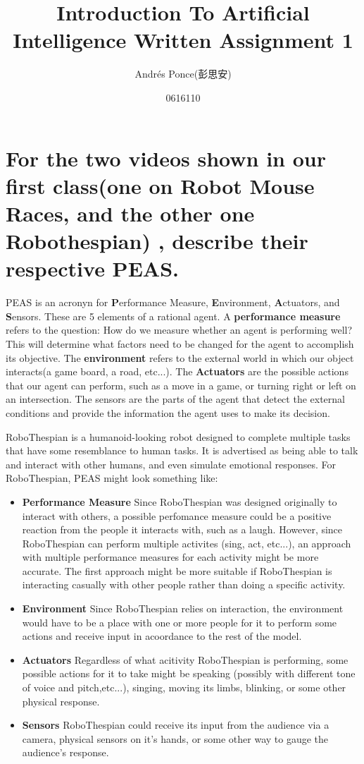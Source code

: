 \documentclass{article}
\title{Introduction To Artificial Intelligence Written Assignment 1}
\author{Andr\'es Ponce(彭思安) \\
\and
0616110}
\begin{document}
\maketitle
\section{For the two videos shown in our first class(one on Robot Mouse Races, and the other one Robothespian)
, describe their respective PEAS.}
PEAS is an acronyn for \textbf{P}erformance Measure, \textbf{E}nvironment, \textbf{A}ctuators, and
\textbf{S}ensors. These are 5 elements of a rational agent. A \textbf{performance measure} 
refers to the question:
How do we measure whether an agent is performing well? This will determine what factors need to be changed
for the agent to accomplish its objective. The \textbf{environment} refers to the external world in which
our object interacts(a game board, a road, etc...). The \textbf{Actuators} are the possible actions that 
our agent can perform, such as a move in a game, or turning right or left on an intersection. The sensors
are the parts of the agent that detect the external conditions and provide the information the agent uses
to make its decision.

RoboThespian is a humanoid-looking robot designed to complete multiple tasks that have some resemblance to 
human tasks. It is advertised as being able to talk and interact with other humans, and even simulate 
emotional responses. For RoboThespian, PEAS might look something like:
\begin{itemize}
	\item \textbf{Performance Measure} Since RoboThespian was designed originally to interact with others,	
			a possible perfomance measure could be a positive reaction from the people it interacts with,
			such as a laugh. 
			However, since RoboThespian can perform multiple activites (sing, act, etc...), an approach with 
			multiple performance measures for each activity might be more accurate. The first approach might	
			be more suitable if RoboThespian is interacting casually with other people rather than doing a
			specific activity.
	\item \textbf{Environment} Since RoboThespian relies on interaction, the environment would have to be 
			a place with one or more people for it to perform some actions and receive input in acoordance 
			to the rest of the model.
	\item \textbf{Actuators} Regardless of what acitivity RoboThespian is performing, some possible 
			actions for it to take might be speaking (possibly with different tone of voice and pitch,etc...),
			singing, moving its limbs, blinking, or some other physical response.
	\item \textbf{Sensors} RoboThespian could receive its input from the audience via a camera, physical 
			sensors on it's hands, or some other way to gauge the audience's response.
\end{itemize}
\end{document}
